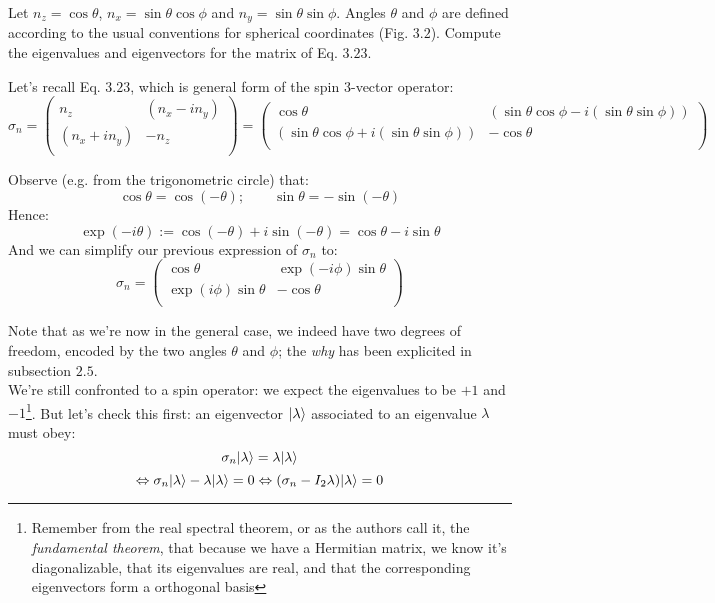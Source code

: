 \documentclass[solutions.tex]{subfiles}
\begin{document}
\maketitle
\begin{exercise}
Let $n_z = \cos\theta$, $n_x = \sin\theta\cos\phi$ and
$n_y = \sin\theta\sin\phi$. Angles $\theta$ and $\phi$ are defined
according to the usual conventions for spherical coordinates (Fig. $3.2$).
Compute the eigenvalues and eigenvectors for the matrix of Eq. $3.23$.
\end{exercise}
Let's recall Eq. $3.23$, which is general form of the spin $3$-vector operator:
\[
	\sigma_n = \begin{pmatrix}
		n_z          & (n_x - in_y) \\
		(n_x + in_y) & -n_z         \\
	\end{pmatrix} = \begin{pmatrix}
		\cos\theta & (\sin\theta\cos\phi - i(\sin\theta\sin\phi))  \\
		(\sin\theta\cos\phi + i(\sin\theta\sin\phi)) & -\cos\theta \\
	\end{pmatrix}
\]

Observe (e.g. from the trigonometric circle) that:
\[
	\cos\theta = \cos(-\theta);\qquad
	\sin\theta = -\sin(-\theta)
\]
Hence:
\[
	\exp(-i\theta) := \cos(-\theta) + i\sin(-\theta)
		= \cos\theta - i\sin\theta
\]
And we can simplify our previous expression of $\sigma_n$ to:
\[
	\sigma_n = \begin{pmatrix}
		\cos\theta & \exp(-i\phi)\sin\theta \\
		\exp(i\phi)\sin\theta & -\cos\theta \\
	\end{pmatrix}
\]

Note that as we're now in the general case, we indeed have two
degrees of freedom, encoded by the two angles $\theta$ and $\phi$;
the \textit{why} has been explicited in subsection $2.5$. \\

We're still confronted to a spin operator: we expect the eigenvalues
to be $+1$ and $-1$\footnote{Remember from the real spectral theorem,
or as the authors call it, the \textit{fundamental theorem}, that because
we have a Hermitian matrix, we know it's diagonalizable, that its eigenvalues
are real, and that the corresponding eigenvectors form a orthogonal
basis}. But let's check this first: an eigenvector $|\lambda\rangle$ associated to an eigenvalue $\lambda$
must obey:
\[
	\sigma_n|\lambda\rangle = \lambda|\lambda\rangle
\]
\[
	\Leftrightarrow \sigma_n|\lambda\rangle - \lambda|\lambda\rangle = 0
	\Leftrightarrow (\sigma_n - I_2\lambda)|\lambda\rangle = 0
\]
\end{document}
